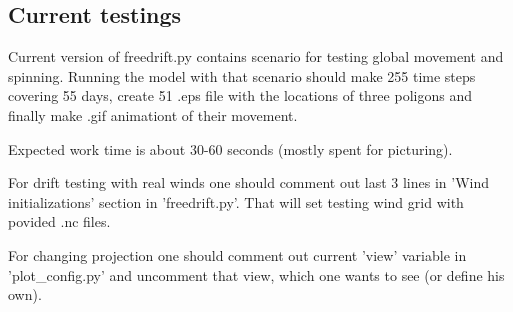 \subsection{Current testings}

Current version of freedrift.py contains scenario for testing global 
movement and spinning. Running the model with that scenario should make
255 time steps covering 55 days, create 51 .eps file with the locations of 
three poligons and finally make .gif animationt of their movement. 

Expected work time is about 30-60 seconds (mostly spent for picturing).

For drift testing with real winds one should comment out last 3 lines in 
'Wind initializations' section in 'freedrift.py'. That will set testing 
wind grid with povided .nc files.

For changing projection one should comment out current 'view' variable 
in 'plot\_config.py' and uncomment that view, which one wants to see 
(or define his own).

